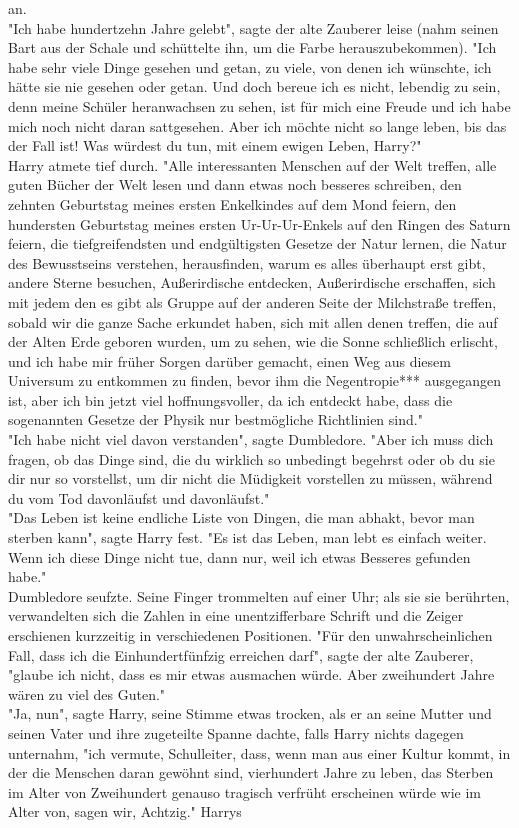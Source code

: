 {an.\\ "Ich habe hundertzehn Jahre gelebt", sagte der alte Zauberer leise (nahm seinen Bart aus der Schale und schüttelte ihn, um die Farbe herauszubekommen). "Ich habe sehr viele Dinge gesehen und getan, zu viele, von denen ich wünschte, ich hätte sie nie gesehen oder getan. Und doch bereue ich es nicht, lebendig zu sein, denn meine Schüler heranwachsen zu sehen, ist für mich eine Freude und ich habe mich noch nicht daran sattgesehen. Aber ich möchte nicht so lange leben, bis das der Fall ist! Was würdest du tun, mit einem ewigen Leben, Harry?"\\ Harry atmete tief durch. "Alle interessanten Menschen auf der Welt treffen, alle guten Bücher der Welt lesen und dann etwas noch besseres schreiben, den zehnten Geburtstag meines ersten Enkelkindes auf dem Mond feiern, den hundersten Geburtstag meines ersten Ur-Ur-Ur-Enkels auf den Ringen des Saturn feiern, die tiefgreifendsten und endgültigsten Gesetze der Natur lernen, die Natur des Bewusstseins verstehen, herausfinden, warum es alles überhaupt erst gibt, andere Sterne besuchen, Außerirdische entdecken, Außerirdische erschaffen, sich mit jedem den es gibt als Gruppe auf der anderen Seite der Milchstraße treffen, sobald wir die ganze Sache erkundet haben, sich mit allen denen treffen, die auf der Alten Erde geboren wurden, um zu sehen, wie die Sonne schließlich erlischt, und ich habe mir früher Sorgen darüber gemacht, einen Weg aus diesem Universum zu entkommen zu finden, bevor ihm die Negentropie*** ausgegangen ist, aber ich bin jetzt viel hoffnungsvoller, da ich entdeckt habe, dass die sogenannten Gesetze der Physik nur bestmögliche Richtlinien sind."\\ "Ich habe nicht viel davon verstanden", sagte Dumbledore. "Aber ich muss dich fragen, ob das Dinge sind, die du wirklich so unbedingt begehrst oder ob du sie dir nur so vorstellst, um dir nicht die Müdigkeit vorstellen zu müssen, während du vom Tod davonläufst und davonläufst."\\ "Das Leben ist keine endliche Liste von Dingen, die man abhakt, bevor man sterben kann", sagte Harry fest. "Es ist das Leben, man lebt es einfach weiter. Wenn ich diese Dinge nicht tue, dann nur, weil ich etwas Besseres gefunden habe."\\ Dumbledore seufzte. Seine Finger trommelten auf einer Uhr; als sie sie berührten, verwandelten sich die Zahlen in eine unentzifferbare Schrift und die Zeiger erschienen kurzzeitig in verschiedenen Positionen. "Für den unwahrscheinlichen Fall, dass ich die Einhundertfünfzig erreichen darf", sagte der alte Zauberer, "glaube ich nicht, dass es mir etwas ausmachen würde. Aber zweihundert Jahre wären zu viel des Guten."\\ "Ja, nun", sagte Harry, seine Stimme etwas trocken, als er an seine Mutter und seinen Vater und ihre zugeteilte Spanne dachte, falls Harry nichts dagegen unternahm, "ich vermute, Schulleiter, dass, wenn man aus einer Kultur kommt, in der die Menschen daran gewöhnt sind, vierhundert Jahre zu leben, das Sterben im Alter von Zweihundert genauso tragisch verfrüht erscheinen würde wie im Alter von, sagen wir, Achtzig." Harrys }
